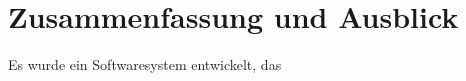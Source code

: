 \chapter{Zusammenfassung und Ausblick}
\label{Zusammenfassung}

Es wurde ein Softwaresystem entwickelt, das 
